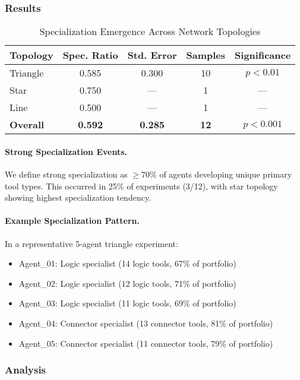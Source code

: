 \subsubsection{Results}

\begin{table}[h]
\centering
\caption{Specialization Emergence Across Network Topologies}
\label{tab:specialization}
\begin{tabular}{@{}lcccc@{}}
\toprule
\textbf{Topology} & \textbf{Spec. Ratio} & \textbf{Std. Error} & \textbf{Samples} & \textbf{Significance} \\
\midrule
Triangle & 0.585 & 0.300 & 10 & $p < 0.01$ \\
Star & 0.750 & --- & 1 & --- \\
Line & 0.500 & --- & 1 & --- \\
\midrule
\textbf{Overall} & \textbf{0.592} & \textbf{0.285} & \textbf{12} & \textbf{$p < 0.001$} \\
\bottomrule
\end{tabular}
\end{table}

\paragraph{Strong Specialization Events.}
We define strong specialization as $\geq 70\%$ of agents developing unique primary tool types. This occurred in 25\% of experiments (3/12), with star topology showing highest specialization tendency.

\paragraph{Example Specialization Pattern.}
In a representative 5-agent triangle experiment:
\begin{itemize}
    \item Agent\_01: Logic specialist (14 logic tools, 67\% of portfolio)
    \item Agent\_02: Logic specialist (12 logic tools, 71\% of portfolio)  
    \item Agent\_03: Logic specialist (11 logic tools, 69\% of portfolio)
    \item Agent\_04: Connector specialist (13 connector tools, 81\% of portfolio)
    \item Agent\_05: Connector specialist (11 connector tools, 79\% of portfolio)
\end{itemize}

\subsubsection{Analysis}

